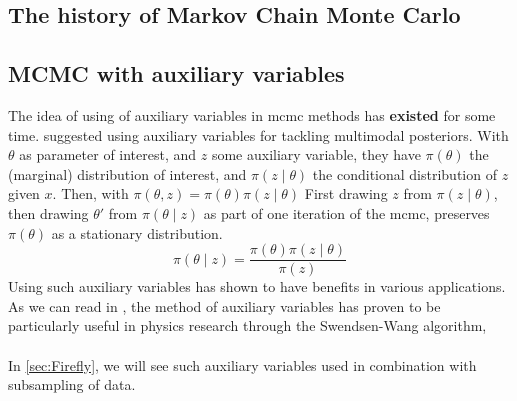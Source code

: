 \documentclass{article}
\theoremstyle{definition}
\begin{document}
\subsection{The history of Markov Chain Monte Carlo}
\subsection{MCMC with auxiliary variables}
The idea of using of auxiliary variables in \gls{mcmc} methods has \textbf{existed} for some time. \cite{Besag} suggested using auxiliary variables for tackling multimodal posteriors. With $\theta$ as parameter of interest, and $z$ some auxiliary variable, they have $\pi\left(\theta\right)$ the (marginal) distribution of interest, and $\pi\left(z\mid\theta\right)$ the conditional distribution of $z$ given $x$. Then, with $\pi\left(\theta, z\right) = \pi\left(\theta\right)\pi\left(z\mid\theta\right)$ 
First drawing $z$ from $\pi\left(z\mid \theta\right)$, then drawing $\theta'$ from $\pi\left(\theta\mid z\right)$ as part of one iteration of the \gls{mcmc}, preserves $\pi\left(\theta\right)$ as a stationary distribution. 
$$\pi\left(\theta\mid z\right) = \frac{\pi\left(\theta\right) \pi\left(z\mid\theta\right)}{\pi\left(z\right)}$$
Using such auxiliary variables has shown to have benefits in various applications. As we can read in \cite{Besag}, the method of auxiliary variables has proven to be particularly useful in physics research through the Swendsen-Wang algorithm, 
\\ \\ In \ref{sec:Firefly}, we will see such auxiliary variables used in combination with subsampling of data.
\end{document}
